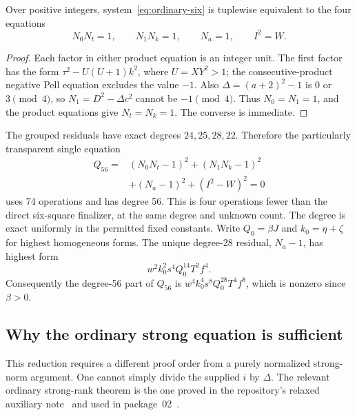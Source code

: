 \begin{proposition}\label{prop:group-ordinary}
Over positive integers, system~\eqref{eq:ordinary-six} is tuplewise
equivalent to the four equations
\begin{equation}\label{eq:ordinary-four}
 \boxed{N_0N_t=1,\qquad N_1N_k=1,\qquad N_a=1,\qquad I^2=W.}
\end{equation}
\end{proposition}
\begin{proof}
Each factor in either product equation is an integer unit. The first
factor has the form
\(\tau^2-U(U+1)k^2\), where \(U=XY^2>1\); the
consecutive-product negative Pell equation excludes the value \(-1\).
Also \(\Delta=(a+2)^2-1\) is \(0\) or \(3\pmod4\), so
\(N_1=D^2-\Delta c^2\) cannot be \(-1\pmod4\). Thus
\(N_0=N_1=1\), and the product equations give \(N_t=N_k=1\).
The converse is immediate.
\end{proof}

The grouped residuals have exact degrees \(24,25,28,22\). Therefore
the particularly transparent single equation
\begin{equation}\label{eq:ordinary-sos74}
 \boxed{\begin{aligned}
 Q_{56}={}&(N_0N_t-1)^2+(N_1N_k-1)^2\\
         &+(N_a-1)^2+(I^2-W)^2=0
 \end{aligned}}
\end{equation}
uses 74 operations and has degree 56. This is four operations fewer
than the direct six-square finalizer, at the same degree and unknown
count. The degree is exact uniformly in the permitted fixed constants.
Write \(Q_0=\beta J\) and \(k_0=\eta+\zeta\) for highest homogeneous
forms. The unique degree-28 residual, \(N_a-1\), has highest form
\[
 w^2k_0^2s^4Q_0^{14}T^2f^4.
\]
Consequently the degree-56 part of \(Q_{56}\) is
\(w^4k_0^4s^8Q_0^{28}T^4f^8\), which is nonzero since \(\beta>0\).

\subsection{Why the ordinary strong equation is sufficient}

This reduction requires a different proof order from a purely normalized
strong-norm argument. One cannot simply divide the supplied \(i\) by
\(\Delta\). The relevant ordinary strong-rank theorem is the one proved
in the repository's relaxed auxiliary note~\cite{relaxed} and used in
package~02~\cite{src02}.

